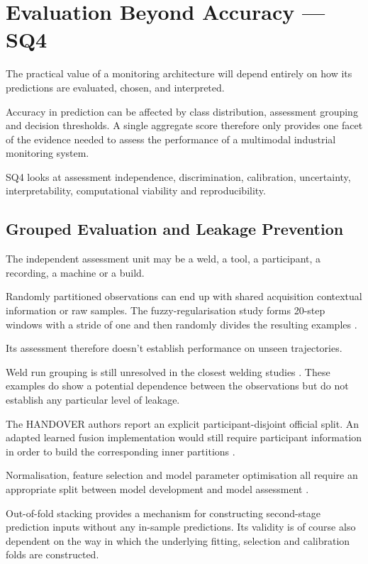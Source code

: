\section{Evaluation Beyond Accuracy --- SQ4}

The practical value of a monitoring architecture will depend entirely on how its predictions are
evaluated, chosen, and interpreted.

Accuracy in prediction can be affected by class distribution, assessment grouping and decision
thresholds. A single aggregate score therefore only provides one facet of the evidence needed to
assess the performance of a multimodal industrial monitoring system.

SQ4 looks at assessment independence, discrimination, calibration, uncertainty, interpretability,
computational viability and reproducibility.

\subsection{Grouped Evaluation and Leakage Prevention}

The independent assessment unit may be a weld, a tool, a participant, a recording, a machine or a
build.

Randomly partitioned observations can end up with shared acquisition contextual information or raw
samples. The fuzzy-regularisation study forms 20-step windows with a stride of one and then randomly
divides the resulting examples \citep[PDF pp.~4--5]{Altinses2023Fuzzy}.

Its assessment therefore doesn't establish performance on unseen trajectories.

Weld run grouping is still unresolved in the closest welding studies \citep{P003,Hua2026Weld}. These
examples do show a potential dependence between the observations but do not establish any particular
level of leakage.

The HANDOVER authors report an explicit participant-disjoint official split. An adapted learned
fusion implementation would still require participant information in order to build the
corresponding inner partitions \citep{Thoduka2024Handover}.

Normalisation, feature selection and model parameter optimisation all require an appropriate split
between model development and model assessment \citep{P004,P017}.

Out-of-fold stacking provides a mechanism for constructing second-stage prediction inputs without
any in-sample predictions. Its validity is of course also dependent on the way in which the
underlying fitting, selection and calibration folds are constructed.

